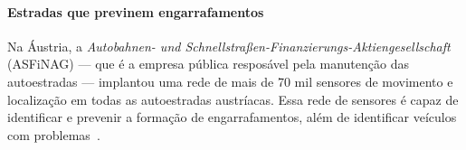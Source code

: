 \documentclass[pdftex, brazil, 12pt, twoside]{article}
\newcommand{\ingles}[1]{\textit{#1}}
\begin{document}
\paragraph{Estradas que previnem engarrafamentos} Na Áustria, 
a \ingles{Autobahnen- und Schnellstraßen-Finanzierungs-Aktiengesellschaft} (ASFiNAG) --- que
é a empresa pública resposável pela manutenção das autoestradas --- implantou uma
rede de mais de 70 mil sensores de movimento e localização em todas as autoestradas
austríacas. Essa rede de sensores é capaz de identificar e prevenir
a formação de engarrafamentos, além de identificar veículos com
problemas~\citep{ASFiNAGIoT2015}.




\end{document}
